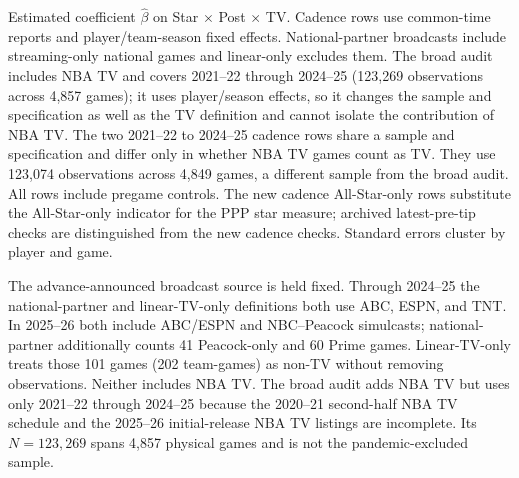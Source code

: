 \documentclass[11pt]{article}
\begin{document}
\begin{table}[!htbp]
\begin{tabular}{@{}llp{3.7cm}rcrr@{}}
\end{tabular}\par\smallskip\raggedright\footnotesize Estimated coefficient $\hat\beta$ on Star $\times$ Post $\times$ TV. Cadence rows use common-time reports and player/team-season fixed effects. National-partner broadcasts include streaming-only national games and linear-only excludes them. The broad audit includes NBA TV and covers 2021--22 through 2024--25 (123,269 observations across 4,857 games); it uses player/season effects, so it changes the sample and specification as well as the TV definition and cannot isolate the contribution of NBA TV. The two 2021--22 to 2024--25 cadence rows share a sample and specification and differ only in whether NBA TV games count as TV. They use 123,074 observations across 4,849 games, a different sample from the broad audit. All rows include pregame controls. The new cadence All-Star-only rows substitute the All-Star-only indicator for the PPP star measure; archived latest-pre-tip checks are distinguished from the new cadence checks. Standard errors cluster by player and game.
\end{table}




The advance-announced broadcast source is held fixed. Through 2024--25 the national-partner and linear-TV-only definitions both use ABC, ESPN, and TNT. In 2025--26 both include ABC/ESPN and NBC--Peacock simulcasts; national-partner additionally counts 41 Peacock-only and 60 Prime games. Linear-TV-only treats those 101 games (202 team-games) as non-TV without removing observations. Neither includes NBA TV. The broad audit adds NBA TV but uses only 2021--22 through 2024--25 because the 2020--21 second-half NBA TV schedule and the 2025--26 initial-release NBA TV listings are incomplete. Its $N=123{,}269$ spans 4,857 physical games and is not the pandemic-excluded sample.
\end{document}
